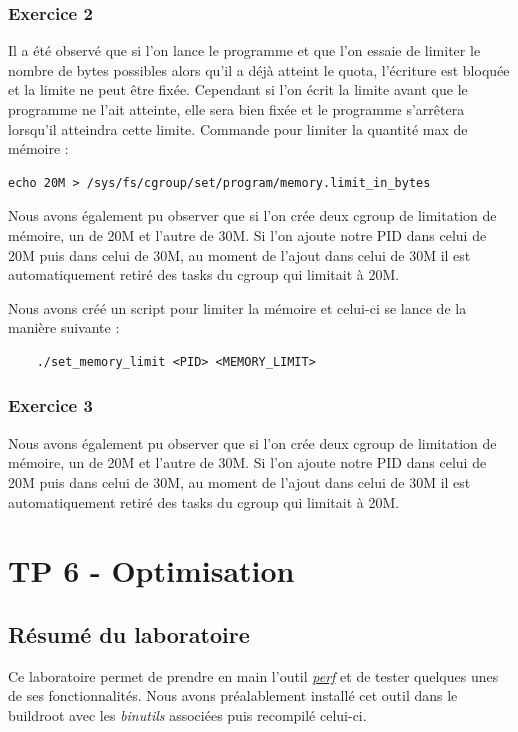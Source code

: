 \documentclass{ReportTemplate}
\begin{document}
\subsection{Exercice 2}
Il a été observé que si l'on lance le programme et que l'on essaie de limiter le
nombre de bytes possibles alors qu'il a déjà atteint le quota, l'écriture est
bloquée et la limite ne peut être fixée. Cependant si l'on écrit la limite avant
que le programme ne l'ait atteinte, elle sera bien fixée et le programme
s'arrêtera lorsqu'il atteindra cette limite.\newline
Commande pour limiter la quantité max de mémoire :
\begin{verbatim}
echo 20M > /sys/fs/cgroup/set/program/memory.limit_in_bytes
\end{verbatim}

Nous avons également pu observer que si l'on crée deux cgroup de limitation de
mémoire, un de 20M et l'autre de 30M. Si l'on ajoute notre PID dans celui de 20M
puis dans celui de 30M, au moment de l'ajout dans celui de 30M il est
automatiquement retiré des tasks du cgroup qui limitait à 20M.\newline

Nous avons créé un script pour limiter la mémoire et celui-ci se lance de la
manière suivante : 
\begin{verbatim}
    ./set_memory_limit <PID> <MEMORY_LIMIT>
\end{verbatim}

\subsection{Exercice 3}
Nous avons également pu observer que si l'on crée deux cgroup de limitation de
mémoire, un de 20M et l'autre de 30M. Si l'on ajoute notre PID dans celui de 20M
puis dans celui de 30M, au moment de l'ajout dans celui de 30M il est
automatiquement retiré des tasks du cgroup qui limitait à 20M.

\chapter{TP 6 - Optimisation}
\section{Résumé du laboratoire}
Ce laboratoire permet de prendre en main l'outil \href{https://man7.org/linux/man-pages/man1/perf.1.html}{\textit{perf}} et de tester
quelques unes de ses fonctionnalités. Nous avons préalablement installé cet
outil dans le buildroot avec les \textit{binutils} associées puis recompilé
celui-ci.
\end{document}
